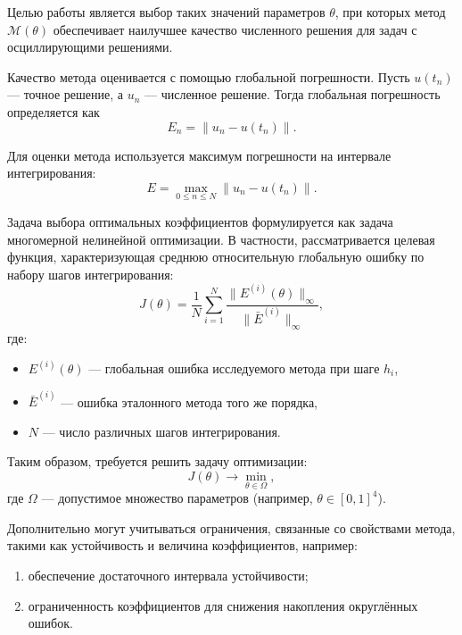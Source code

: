Целью работы является выбор таких значений параметров $\theta$, при которых метод $\mathcal{M}(\theta)$ обеспечивает наилучшее качество численного решения для задач с осциллирующими решениями.

Качество метода оценивается с помощью глобальной погрешности. Пусть $u(t_n)$ — точное решение, а $u_n$ — численное решение. Тогда глобальная погрешность определяется как
\begin{equation}
	E_n = \|u_n - u(t_n)\|.
\end{equation}

Для оценки метода используется максимум погрешности на интервале интегрирования:
\begin{equation}
	E = \max_{0 \le n \le N} \|u_n - u(t_n)\|.
\end{equation}

\medskip

Задача выбора оптимальных коэффициентов формулируется как задача многомерной нелинейной оптимизации. В частности, рассматривается целевая функция, характеризующая среднюю относительную глобальную ошибку по набору шагов интегрирования:
\begin{equation}
	J(\theta) = \frac{1}{N} \sum_{i=1}^{N} 
	\frac{\|E^{(i)}(\theta)\|_{\infty}}{\|\bar{E}^{(i)}\|_{\infty}},
\end{equation}
где:
\begin{itemize}
	\item $E^{(i)}(\theta)$ — глобальная ошибка исследуемого метода при шаге $h_i$,
	\item $\bar{E}^{(i)}$ — ошибка эталонного метода того же порядка,
	\item $N$ — число различных шагов интегрирования.
\end{itemize}

Таким образом, требуется решить задачу оптимизации:
\begin{equation}
	J(\theta) \to \min_{\theta \in \Omega},
\end{equation}
где $\Omega$ — допустимое множество параметров (например, $\theta \in [0,1]^4$).

\medskip

Дополнительно могут учитываться ограничения, связанные со свойствами метода, такими как устойчивость и величина коэффициентов, например:
\begin{enumerate}
	\item обеспечение достаточного интервала устойчивости;
	\item ограниченность коэффициентов для снижения накопления округлённых ошибок.
\end{enumerate}

